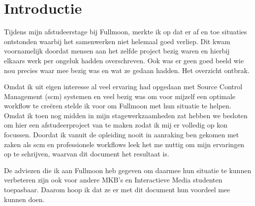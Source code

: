 \setcounter{chapter}{0}
\chapter{Introductie}
  
Tijdens mijn afstudeerstage bij Fullmoon, merkte ik op dat er af en toe situaties ontstonden waarbij het samenwerken niet helemaal goed verliep. Dit kwam voornamelijk doordat mensen aan het zelfde project bezig waren en hierbij elkaars werk per ongeluk hadden overschreven. Ook was er geen goed beeld wie nou precies waar mee bezig was en wat ze gedaan hadden. Het overzicht ontbrak.
  
Omdat ik uit eigen interesse al veel ervaring had opgedaan met Source Control Management ({\sc scm}) systemen en veel bezig was om voor mijzelf een optimale workflow te creëren stelde ik voor om Fullmoon met hun situatie te helpen. Omdat ik toen nog midden in mijn stagewerkzaamheden zat hebben we besloten om hier een afstudeerproject van te maken zodat ik mij er volledig op kon focussen. Doordat ik vanuit de opleiding nooit in aanraking ben gekomen met zaken als {\sc scm} en professionele workflows leek het me nuttig om mijn ervaringen op te schrijven, waarvan dit document het resultaat is.

De adviezen die ik aan Fullmoon heb gegeven om daarmee hun situatie te kunnen verbeteren zijn ook voor andere MKB's en Interactieve Media studenten toepasbaar. Daarom hoop ik dat ze er met dit document hun voordeel mee kunnen doen.
